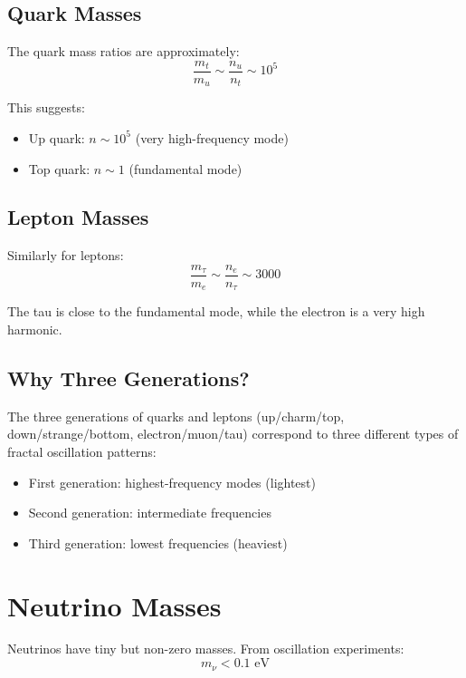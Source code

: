 \subsection{Quark Masses}

The quark mass ratios are approximately:
\begin{equation}
\frac{m_t}{m_u} \sim \frac{n_u}{n_t} \sim 10^5
\end{equation}

This suggests:
\begin{itemize}[leftmargin=*]
\item Up quark: $n \sim 10^5$ (very high-frequency mode)
\item Top quark: $n \sim 1$ (fundamental mode)
\end{itemize}

\subsection{Lepton Masses}

Similarly for leptons:
\begin{equation}
\frac{m_\tau}{m_e} \sim \frac{n_e}{n_\tau} \sim 3000
\end{equation}

The tau is close to the fundamental mode, while the electron is a very high harmonic.

\subsection{Why Three Generations?}

The three generations of quarks and leptons (up/charm/top, down/strange/bottom, electron/muon/tau) correspond to three different types of fractal oscillation patterns:
\begin{itemize}[leftmargin=*]
\item First generation: highest-frequency modes (lightest)
\item Second generation: intermediate frequencies
\item Third generation: lowest frequencies (heaviest)
\end{itemize}

\section{Neutrino Masses}

Neutrinos have tiny but non-zero masses. From oscillation experiments:
\begin{equation}
m_\nu < 0.1 \text{ eV}
\end{equation}

